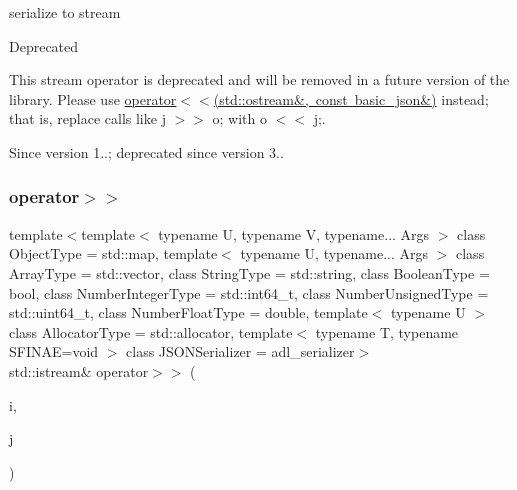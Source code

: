 serialize to stream 

\begin{DoxyRefDesc}{Deprecated}
\item[\mbox{\hyperlink{deprecated__deprecated000001}{Deprecated}}]This stream operator is deprecated and will be removed in a future version of the library. Please use \mbox{\hyperlink{classnlohmann_1_1basic__json_a5e34c5435e557d0bf666bd7311211405}{operator$<$$<$(std\+::ostream\&, const basic\+\_\+json\&)}} instead; that is, replace calls like {\ttfamily j $>$$>$ o;} with {\ttfamily o $<$$<$ j;}. \end{DoxyRefDesc}
\begin{DoxySince}{Since}
version 1..; deprecated since version 3.. 
\end{DoxySince}
\mbox{\label{classnlohmann_1_1basic__json_aaf363408931d76472ded14017e59c9e8}} 
\subsubsection{\texorpdfstring{operator$>$$>$}{operator>>}\hspace{0.1cm}{\footnotesize\ttfamily [2/2]}}
{\footnotesize\ttfamily template$<$template$<$ typename U, typename V, typename... Args $>$ class Object\+Type = std\+::map, template$<$ typename U, typename... Args $>$ class Array\+Type = std\+::vector, class String\+Type  = std\+::string, class Boolean\+Type  = bool, class Number\+Integer\+Type  = std\+::int64\+\_\+t, class Number\+Unsigned\+Type  = std\+::uint64\+\_\+t, class Number\+Float\+Type  = double, template$<$ typename U $>$ class Allocator\+Type = std\+::allocator, template$<$ typename T, typename S\+F\+I\+N\+A\+E=void $>$ class J\+S\+O\+N\+Serializer = adl\+\_\+serializer$>$ \\
std\+::istream\& operator$>$$>$ (\begin{DoxyParamCaption}\item[{std\+::istream \&}]{i,  }\item[{\mbox{\hyperlink{classnlohmann_1_1basic__json}{basic\+\_\+json}}$<$ Object\+Type, Array\+Type, String\+Type, Boolean\+Type, Number\+Integer\+Type, Number\+Unsigned\+Type, Number\+Float\+Type, Allocator\+Type, J\+S\+O\+N\+Serializer $>$ \&}]{j }\end{DoxyParamCaption})\hspace{0.3cm}{\ttfamily [friend]}}



